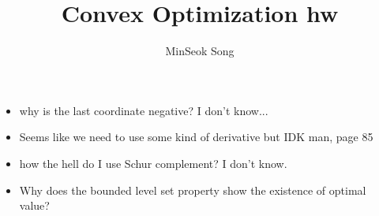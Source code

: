 \documentclass{article}
\title{Convex Optimization hw}
\author{MinSeok Song}
\date{}
\theoremstyle{remark}
\begin{document}
\maketitle
\begin{itemize}
\item why is the last coordinate negative? I don't know...
\item Seems like we need to use some kind of derivative but IDK man, page 85
\item how the hell do I use Schur complement? I don't know.
\item Why does the bounded level set property show the existence of optimal value?
\end{itemize}
\end{document}
